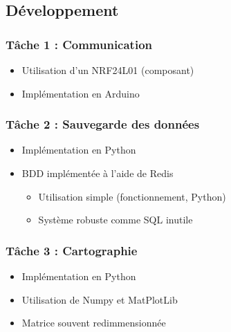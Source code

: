 \documentclass{beamer}
\begin{document}
{      %
      \subsection{Développement}
	\begin{frame} %
	  \frametitle{Tâche 1 : Communication}
	  
	  \begin{itemize}
	    \item Utilisation d'un NRF24L01 (composant)
	    \item Implémentation en Arduino
	  \end{itemize}
	\end{frame}
	
	\begin{frame} %
	  \frametitle{Tâche 2 : Sauvegarde des données}
	  
	  \begin{itemize}
	    \item Implémentation en Python
	    \item BDD implémentée à l'aide de Redis
	    \begin{itemize}
	      \item Utilisation simple (fonctionnement, Python)
	      \item Système robuste comme SQL inutile
	    \end{itemize}
	  \end{itemize}
	\end{frame}
	
	\begin{frame} %
	  \frametitle{Tâche 3 : Cartographie}
	  
	  \begin{itemize}
	    \item Implémentation en Python
	    \item Utilisation de Numpy et MatPlotLib
	    \item Matrice souvent redimmensionnée
	  \end{itemize}
	\end{frame}
	
}
\end{document}
